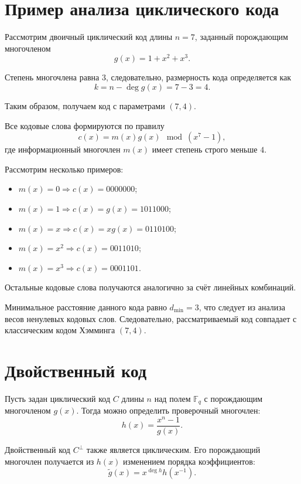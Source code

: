 \documentclass[a4paper,12pt]{article}
\begin{document}
\section{Пример анализа циклического кода}

Рассмотрим двоичный циклический код длины $n = 7$, заданный порождающим многочленом
\[
g(x) = 1 + x^2 + x^3.
\]

Степень многочлена равна $3$, следовательно, размерность кода определяется как
\[
k = n - \deg g(x) = 7 - 3 = 4.
\]

Таким образом, получаем код с параметрами $(7,4)$.

Все кодовые слова формируются по правилу
\[
c(x) = m(x)g(x) \mod (x^7 - 1),
\]
где информационный многочлен $m(x)$ имеет степень строго меньше $4$.

Рассмотрим несколько примеров:

\begin{itemize}
    \item $m(x) = 0 \Rightarrow c(x) = 0000000$;
    
    \item $m(x) = 1 \Rightarrow c(x) = g(x) = 1011000$;
    
    \item $m(x) = x \Rightarrow c(x) = xg(x) = 0110100$;
    
    \item $m(x) = x^2 \Rightarrow c(x) = 0011010$;
    
    \item $m(x) = x^3 \Rightarrow c(x) = 0001101$.
\end{itemize}

Остальные кодовые слова получаются аналогично за счёт линейных комбинаций.

Минимальное расстояние данного кода равно $d_{\min} = 3$, что следует из анализа весов ненулевых кодовых слов. Следовательно, рассматриваемый код совпадает с классическим кодом Хэмминга $(7,4)$.

\section{Двойственный код}

Пусть задан циклический код $C$ длины $n$ над полем $\mathbb{F}_q$ с порождающим многочленом $g(x)$. Тогда можно определить проверочный многочлен:
\[
h(x) = \frac{x^n - 1}{g(x)}.
\]

Двойственный код $C^\perp$ также является циклическим. Его порождающий многочлен получается из $h(x)$ изменением порядка коэффициентов:
\[
\tilde{g}(x) = x^{\deg h} h(x^{-1}).
\]
\end{document}
